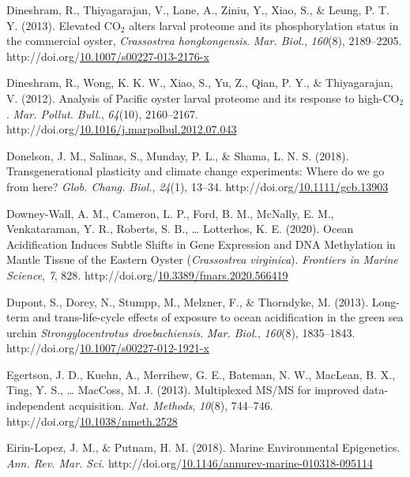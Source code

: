 \documentclass [11pt, proquest] {uwthesis}[2015/03/03]
\newlength{\cslhangindent}
\newenvironment{CSLReferences}%
{\setlength{\parindent}{0pt}%
\everypar{\setlength{\hangindent}{\cslhangindent}}\ignorespaces}%
{\par}
\begin{document}
\begin{CSLReferences}{1}{0}
\leavevmode\hypertarget{ref-Dineshram2013}{}%
Dineshram, R., Thiyagarajan, V., Lane, A., Ziniu, Y., Xiao, S., \& Leung, P. T. Y. (2013). {Elevated {CO\(_2\)} alters larval proteome and its phosphorylation status in the commercial oyster, \emph{Crassostrea hongkongensis}}. \emph{Mar. Biol.}, \emph{160}(8), 2189--2205. http://doi.org/\href{https://doi.org/10.1007/s00227-013-2176-x}{10.1007/s00227-013-2176-x}

\leavevmode\hypertarget{ref-Dineshram2012}{}%
Dineshram, R., Wong, K. K. W., Xiao, S., Yu, Z., Qian, P. Y., \& Thiyagarajan, V. (2012). {Analysis of Pacific oyster larval proteome and its response to high-{CO\(_2\)}}. \emph{Mar. Pollut. Bull.}, \emph{64}(10), 2160--2167. http://doi.org/\href{https://doi.org/10.1016/j.marpolbul.2012.07.043}{10.1016/j.marpolbul.2012.07.043}

\leavevmode\hypertarget{ref-Donelson2018}{}%
Donelson, J. M., Salinas, S., Munday, P. L., \& Shama, L. N. S. (2018). {Transgenerational plasticity and climate change experiments: Where do we go from here?} \emph{Glob. Chang. Biol.}, \emph{24}(1), 13--34. http://doi.org/\href{https://doi.org/10.1111/gcb.13903}{10.1111/gcb.13903}

\leavevmode\hypertarget{ref-Downey-Wall2020}{}%
Downey-Wall, A. M., Cameron, L. P., Ford, B. M., McNally, E. M., Venkataraman, Y. R., Roberts, S. B., \ldots{} Lotterhos, K. E. (2020). {Ocean Acidification Induces Subtle Shifts in Gene Expression and DNA Methylation in Mantle Tissue of the Eastern Oyster (\emph{Crassostrea virginica})}. \emph{Frontiers in Marine Science}, \emph{7}, 828. http://doi.org/\href{https://doi.org/10.3389/fmars.2020.566419}{10.3389/fmars.2020.566419}

\leavevmode\hypertarget{ref-Dupont2013}{}%
Dupont, S., Dorey, N., Stumpp, M., Melzner, F., \& Thorndyke, M. (2013). {Long-term and trans-life-cycle effects of exposure to ocean acidification in the green sea urchin \emph{Strongylocentrotus droebachiensis}}. \emph{Mar. Biol.}, \emph{160}(8), 1835--1843. http://doi.org/\href{https://doi.org/10.1007/s00227-012-1921-x}{10.1007/s00227-012-1921-x}

\leavevmode\hypertarget{ref-Egertson2013}{}%
Egertson, J. D., Kuehn, A., Merrihew, G. E., Bateman, N. W., MacLean, B. X., Ting, Y. S., \ldots{} MacCoss, M. J. (2013). {Multiplexed MS/MS for improved data-independent acquisition}. \emph{Nat. Methods}, \emph{10}(8), 744--746. http://doi.org/\href{https://doi.org/10.1038/nmeth.2528}{10.1038/nmeth.2528}

\leavevmode\hypertarget{ref-Eirin-Lopez2018}{}%
Eirin-Lopez, J. M., \& Putnam, H. M. (2018). {Marine Environmental Epigenetics}. \emph{Ann. Rev. Mar. Sci.} http://doi.org/\href{https://doi.org/10.1146/annurev-marine-010318-095114}{10.1146/annurev-marine-010318-095114}


\end{CSLReferences}
\end{document}

